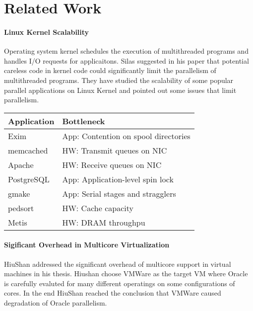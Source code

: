 \section{Related Work}
\label{sec:rel}

\paragraph{Linux Kernel Scalability} Operating system kernel schedules the
execution of multithreaded programs and handles I/O requests for 
applicaitons. Silas\cite{rel:silas} suggested in his paper that potential
careless code in kernel code could significantly limit the parallelism of 
multithreaded programs. They have studied the scalability of some popular 
parallel applications on Linux Kernel and pointed out some issues that 
limit parallelism.
\begin{center}
\begin{tabular}[t] {l|l} 
Application & Bottleneck \\
\hline
Exim &App: Contention on spool directories \\
memcached &HW: Transmit queues on NIC \\
Apache &HW: Receive queues on NIC \\
PostgreSQL &App: Application-level spin lock \\
gmake &App: Serial stages and stragglers \\
pedsort &HW: Cache capacity \\
Metis &HW: DRAM throughpu 
\end{tabular}
\end{center}

\paragraph{Sigificant Overhead in Multicore Virtualization} HiuShan 
\cite{rel:hiushan} addressed the significant overhead of multicore support
in virtual machines in his thesis. Hiushan choose VMWare as the target VM
where Oracle is carefully evaluted for many different operatings on some 
configurations of cores. In the end HiuShan reached the conclusion that VMWare
caused degradation of Oracle parallelism. 

%
